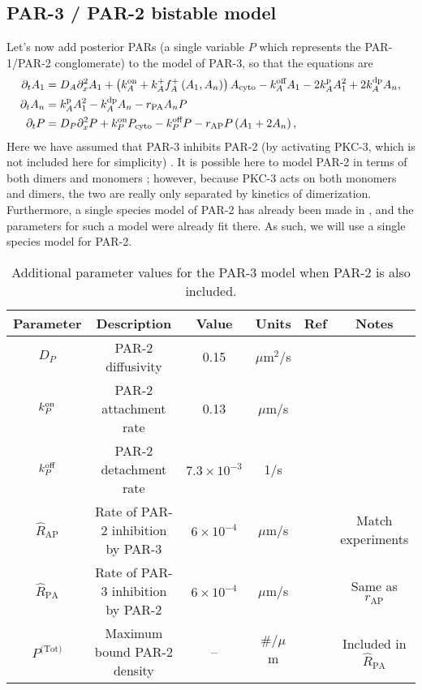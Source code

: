 \documentclass[11pt]{article}
\newcommand{\6}[1]{#1_{\text{6}}}
\newcommand{\3}[1]{#1_{\text{3}}}
\newcommand{\Tot}[1]{#1^\text{(Tot)}}
\newcommand{\A}[1]{#1_A}
\begin{document}
\iffalse
\subsection{PAR-3 / PAR-2 bistable model \label{sec:P2P3}}
Let's now add posterior PARs (a single variable $P$ which represents the PAR-1/PAR-2 conglomerate) to the model of PAR-3, so that the equations are 
\begin{subequations}
\label{eq:P32}
\begin{align}
\Dt A_1 &= D_A \Dx^2 A_1 +\left( \kon_A +\A{\kf}\A{f}^+\left(\MA,\PA\right)\right) A_\text{cyto} - \koff_A \MA -2\kp_A \MA^2+2\kdp_A \PA,\\
\Dt \PA &= \kp_A \MA^2 - \kdp_A \PA-r_\text{PA} \PA P\\
\Dt P &= D_P \Dx^2 P + \kon_P P_\text{cyto} - \koff_P P -r_\text{AP} P\left(\MA+2\PA\right),%
\end{align}
\end{subequations}
Here we have assumed that PAR-3 inhibits PAR-2 (by activating PKC-3, which is not included here for simplicity) \cite{lang2017proteins}. It is possible here to model PAR-2 in terms of both dimers and monomers \cite{bland2023optimized}; however, because PKC-3 acts on both monomers and dimers, the two are really only separated by kinetics of dimerization. Furthermore, a single species model of PAR-2 has already been made in \cite{gross2019guiding}, and the parameters for such a model were already fit there. As such, we will use a single species model for PAR-2. 

\begin{table}
\begin{small}
\centering
\begin{tabular}{|c|c|c|c|c|c|}\hline
Parameter & Description & Value & Units & Ref & Notes \\ \hline
$D_P$ & PAR-2 diffusivity & 0.15 & $\mu$m$^2$/s & \cite{goehring2011polarization}&  \\ 
$k^\text{on}_P$ & PAR-2 attachment rate & 0.13 & $\mu$m/s &\cite{gross2019guiding} & \\ 
$k^\text{off}_P$ & PAR-2 detachment rate & $7.3 \times 10^{-3}$ & 1/s & \cite{goehring2011polarization}&  \\  
$\hat{R}_\text{AP}$ & Rate of PAR-2 inhibition by PAR-3 & $6 \times 10^{-4}$ & $\mu$m/s & & Match experiments \cite[Fig.~5B]{zonies2010symmetry}\\
$\hat{R}_\text{PA}$ & Rate of PAR-3 inhibition by PAR-2 &$6 \times 10^{-4}$  & $\mu$m/s & \ & Same as $r_\text{AP}$\\
$\Tot{P}$ & Maximum bound PAR-2 density & -- & $\#/\mu$m& &  Included in $\hat{R}_\text{PA}$ \\ \hline
\end{tabular}
\caption{\label{tab:paramsP2}Additional parameter values for the PAR-3 model when PAR-2  is also included.}
\end{small}
\end{table}
\end{document}
